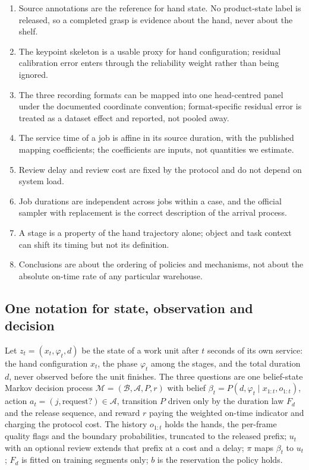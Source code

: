 \documentclass{swmcmthesis}
\begin{document}
\begin{enumerate}
\item Source annotations are the reference for hand state. No product-state label is
released, so a completed grasp is evidence about the hand, never about the shelf.
\item The keypoint skeleton is a usable proxy for hand configuration; residual
calibration error enters through the reliability weight rather than being ignored.
\item The three recording formats can be mapped into one head-centred panel under the
documented coordinate convention; format-specific residual error is treated as a
dataset effect and reported, not pooled away.
\item The service time of a job is affine in its source duration, with the published
mapping coefficients; the coefficients are inputs, not quantities we estimate.
\item Review delay and review cost are fixed by the protocol and do not depend on
system load.
\item Job durations are independent across jobs within a case, and the official
sampler with replacement is the correct description of the arrival process.
\item A stage is a property of the hand trajectory alone; object and task context can
shift its timing but not its definition.
\item Conclusions are about the ordering of policies and mechanisms, not about the
absolute on-time rate of any particular warehouse.
\end{enumerate}

\subsection{One notation for state, observation and decision}
\label{sec:notation}

Let $z_t=(x_t,\varphi_t,d)$ be the state of a work unit after $t$ seconds of its own
service: the hand configuration $x_t$, the phase $\varphi_t$ among the \slotNStages{}
stages, and the total duration $d$, never observed before the unit finishes. The three
questions are one belief-state Markov decision process
$\mathcal{M}=(\mathcal{B},\mathcal{A},P,r)$ with belief
$\beta_t=P(d,\varphi_t\mid x_{1:t},o_{1:t})$, action
$a_t=(j,\text{request?})\in\mathcal{A}$, transition $P$ driven only by the duration law
$F_d$ and the release sequence, and reward $r$ paying the weighted on-time indicator and
charging the protocol cost. The history $o_{1:t}$ holds the hands, the per-frame quality
flags and the boundary probabilities, truncated to the released prefix; $u_t$ with an
optional review extends that prefix at a cost and a delay; $\pi$ maps $\beta_t$ to $u_t$;
$F_d$ is fitted on training segments only; $b$ is the reservation the policy holds.
\end{document}
